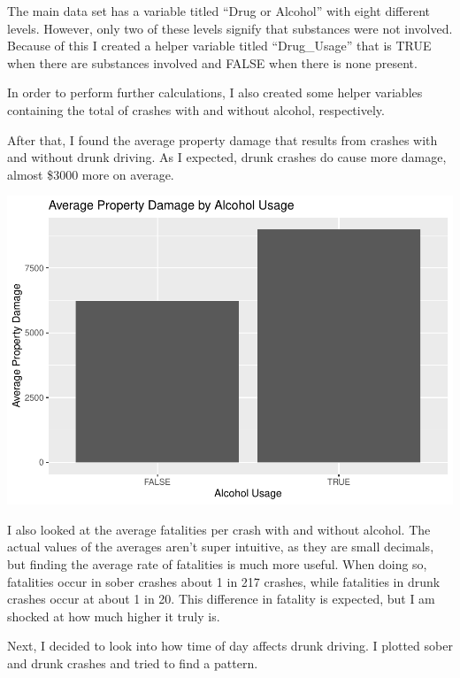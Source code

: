 \documentclass[conference,final,]{IEEEtran}
\begin{document}
The main data set has a variable titled ``Drug or Alcohol'' with eight different levels. However, only two of these levels signify that substances were not involved. Because of this I created a helper variable titled ``Drug\_Usage'' that is TRUE when there are substances involved and FALSE when there is none present.

In order to perform further calculations, I also created some helper variables containing the total of crashes with and without alcohol, respectively.

After that, I found the average property damage that results from crashes with and without drunk driving. As I expected, drunk crashes do cause more damage, almost \$3000 more on average.

\begin{center}\includegraphics[width=0.9\columnwidth]{CAUSE_files/figure-latex/unnamed-chunk-9-1} \end{center}

I also looked at the average fatalities per crash with and without alcohol. The actual values of the averages aren't super intuitive, as they are small decimals, but finding the average rate of fatalities is much more useful. When doing so, fatalities occur in sober crashes about 1 in 217 crashes, while fatalities in drunk crashes occur at about 1 in 20. This difference in fatality is expected, but I am shocked at how much higher it truly is.

Next, I decided to look into how time of day affects drunk driving. I plotted sober and drunk crashes and tried to find a pattern.
\end{document}
